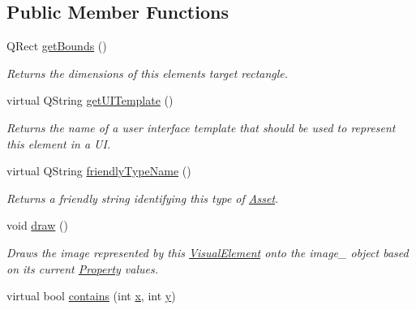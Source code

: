 \subsection*{Public Member Functions}
\begin{DoxyCompactItemize}
\item 
\hypertarget{class_picto_1_1_rect_target_a3e3f2fc9e09468643858ae62df60f442}{Q\-Rect \hyperlink{class_picto_1_1_rect_target_a3e3f2fc9e09468643858ae62df60f442}{get\-Bounds} ()}\label{class_picto_1_1_rect_target_a3e3f2fc9e09468643858ae62df60f442}

\begin{DoxyCompactList}\small\item\em Returns the dimensions of this elements target rectangle. \end{DoxyCompactList}\item 
\hypertarget{class_picto_1_1_rect_target_ab5d7db71ec8b5c99589c328211067433}{virtual Q\-String \hyperlink{class_picto_1_1_rect_target_ab5d7db71ec8b5c99589c328211067433}{get\-U\-I\-Template} ()}\label{class_picto_1_1_rect_target_ab5d7db71ec8b5c99589c328211067433}

\begin{DoxyCompactList}\small\item\em Returns the name of a user interface template that should be used to represent this element in a U\-I. \end{DoxyCompactList}\item 
virtual Q\-String \hyperlink{class_picto_1_1_rect_target_a13dd96ae3f77ed63405f184d1b8c45ff}{friendly\-Type\-Name} ()
\begin{DoxyCompactList}\small\item\em Returns a friendly string identifying this type of \hyperlink{class_picto_1_1_asset}{Asset}. \end{DoxyCompactList}\item 
\hypertarget{class_picto_1_1_rect_target_a1e1c978b208b3f59dc8cfdebdc1fe307}{void \hyperlink{class_picto_1_1_rect_target_a1e1c978b208b3f59dc8cfdebdc1fe307}{draw} ()}\label{class_picto_1_1_rect_target_a1e1c978b208b3f59dc8cfdebdc1fe307}

\begin{DoxyCompactList}\small\item\em Draws the image represented by this \hyperlink{struct_picto_1_1_visual_element}{Visual\-Element} onto the image\-\_\- object based on its current \hyperlink{class_picto_1_1_property}{Property} values. \end{DoxyCompactList}\item 
\hypertarget{class_picto_1_1_rect_target_a541ee03cf51cdb1f5752026b6d53f98f}{virtual bool \hyperlink{class_picto_1_1_rect_target_a541ee03cf51cdb1f5752026b6d53f98f}{contains} (int \hyperlink{struct_picto_1_1_visual_element_a1b50bc5fa41868f661687015be3c97e8}{x}, int \hyperlink{struct_picto_1_1_visual_element_a9a4db3430219e1f78208eda1a89e9f38}{y})}\label{class_picto_1_1_rect_target_a541ee03cf51cdb1f5752026b6d53f98f}


\end{DoxyCompactItemize}
